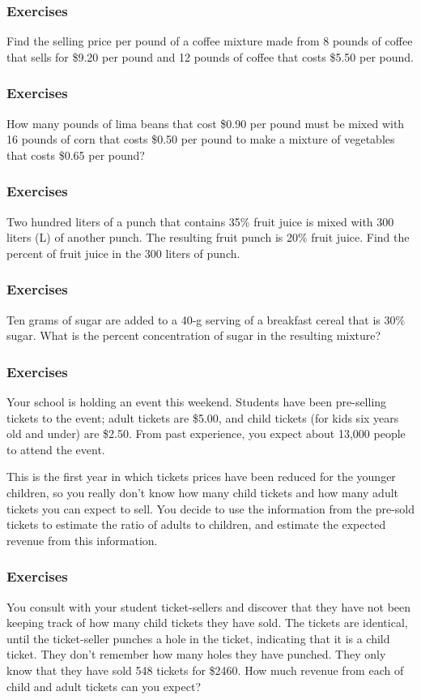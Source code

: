 \documentclass[xcolor=dvipsnames]{beamer}
\begin{document}
\begin{frame}
  \frametitle{Exercises}
  {\ubung} Find the selling price per pound of a coffee mixture made
  from 8 pounds of coffee that sells for \$9.20 per pound and 12
  pounds of coffee that costs \$5.50 per pound.
\end{frame}

\begin{frame}
  \frametitle{Exercises}
  {\ubung} How many pounds of lima beans that cost \$0.90 per pound
  must be mixed with 16 pounds of corn that costs \$0.50 per pound to
  make a mixture of vegetables that costs \$0.65 per pound?
\end{frame}

\begin{frame}
  \frametitle{Exercises}
  {\ubung} Two hundred liters of a punch that contains 35\% fruit
  juice is mixed with 300 liters (L) of another punch. The resulting
  fruit punch is 20\% fruit juice. Find the percent of fruit juice in
  the 300 liters of punch.
\end{frame}

\begin{frame}
  \frametitle{Exercises}
  {\ubung} Ten grams of sugar are added to a 40-g serving of a
  breakfast cereal that is 30\% sugar. What is the percent
  concentration of sugar in the resulting mixture?
\end{frame}

\begin{frame}
  \frametitle{Exercises}
  {\ubung} Your school is holding an event this weekend. Students have
  been pre-selling tickets to the event; adult tickets are \$5.00, and
  child tickets (for kids six years old and under) are \$2.50. From
  past experience, you expect about 13,000 people to attend the event.

  This is the first year in which tickets prices have been reduced for
  the younger children, so you really don't know how many child
  tickets and how many adult tickets you can expect to sell. You
  decide to use the information from the pre-sold tickets to estimate
  the ratio of adults to children, and estimate the expected revenue
  from this information.
\end{frame}

\begin{frame}
  \frametitle{Exercises}
  You consult with your student ticket-sellers and discover that they
  have not been keeping track of how many child tickets they have
  sold. The tickets are identical, until the ticket-seller punches a
  hole in the ticket, indicating that it is a child ticket. They don't
  remember how many holes they have punched. They only know that they
  have sold 548 tickets for \$2460. How much revenue from each of
  child and adult tickets can you expect?
\end{frame}
\end{document}
